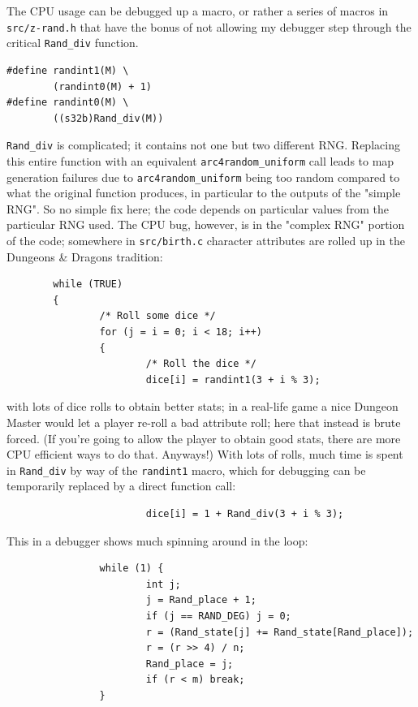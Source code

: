 \documentclass[12pt,a4paper]{article}
\begin{document}
The CPU usage can be debugged up a macro, or rather a series of macros
in \texttt{src/z-rand.h} that have the bonus of not allowing my debugger
step through the critical \texttt{Rand\_div} function.

\begin{verbatim}
#define randint1(M) \
        (randint0(M) + 1)
#define randint0(M) \
        ((s32b)Rand_div(M))
\end{verbatim}

\texttt{Rand\_div} is complicated; it contains not one but two different
RNG. Replacing this entire function with an equivalent
\texttt{arc4random\_uniform} call leads to map generation failures due to
\texttt{arc4random\_uniform} being too random compared to what the
original function produces, in particular to the outputs of the "simple
RNG". So no simple fix here; the code depends on particular values from
the particular RNG used. The CPU bug, however, is in the "complex RNG"
portion of the code; somewhere in \texttt{src/birth.c} character
attributes are rolled up in the Dungeons \& Dragons tradition:

\begin{verbatim}
        while (TRUE)
        {
                /* Roll some dice */
                for (j = i = 0; i < 18; i++)
                {
                        /* Roll the dice */
                        dice[i] = randint1(3 + i % 3);
\end{verbatim}

with lots of dice rolls to obtain better stats; in a real-life game a
nice Dungeon Master would let a player re-roll a bad attribute roll;
here that instead is brute forced. (If you're going to allow the player
to obtain good stats, there are more CPU efficient ways to do that.
Anyways!) With lots of rolls, much time is spent in \texttt{Rand\_div} by
way of the \texttt{randint1} macro, which for debugging can be
temporarily replaced by a direct function call:

\begin{verbatim}
                        dice[i] = 1 + Rand_div(3 + i % 3);
\end{verbatim}

This in a debugger shows much spinning around in the loop:

\begin{verbatim}
                while (1) {
                        int j;
                        j = Rand_place + 1;
                        if (j == RAND_DEG) j = 0;
                        r = (Rand_state[j] += Rand_state[Rand_place]);
                        r = (r >> 4) / n;
                        Rand_place = j;
                        if (r < m) break;
                }
\end{verbatim}
\end{document}
